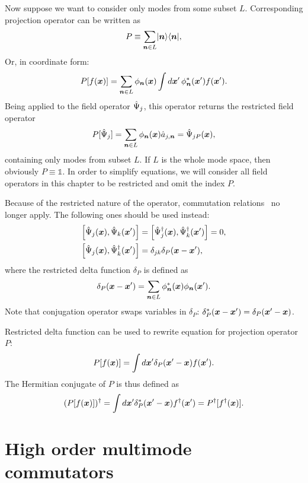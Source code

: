 Now suppose we want to consider only modes from some subset $L$.
Corresponding projection operator can be written as
\[
	P \equiv \sum\limits_{\boldsymbol{n} \in L} \lvert \boldsymbol{n} \rangle \langle \boldsymbol{n} \rvert,
\]
Or, in coordinate form:
\[
	P [f(\boldsymbol{x})]
	= \sum\limits_{\boldsymbol{n} \in L} \phi_{\boldsymbol{n}} (\boldsymbol{x}) \int
		d\boldsymbol{x}^\prime\, \phi_{\boldsymbol{n}}^*(\boldsymbol{x}^\prime) f(\boldsymbol{x}^\prime).
\]
Being applied to the field operator $\hat{\Psi}_j$, this operator returns the restricted field operator
\[
	P [\hat{\Psi}_j]
	= \sum\limits_{\boldsymbol{n} \in L} \phi_{\boldsymbol{n}} (\boldsymbol{x}) \hat{a}_{j,\boldsymbol{n}}
	= \hat{\Psi}_{jP} (\boldsymbol{x}),
\]
containing only modes from subset $L$.
If $L$ is the whole mode space, then obviously $P \equiv \mathds{1}$.
In order to simplify equations, we will consider all field operators in this chapter to be restricted and omit the index $P$.

Because of the restricted nature of the operator, commutation relations~ no longer apply.
The following ones should be used instead:
\begin{equation}
\label{eqn:multimode-formalism:restricted-commutators}
\begin{split}
	\left[ \hat{\Psi}_j(\boldsymbol{x}), \hat{\Psi}_k(\boldsymbol{x}^\prime) \right]
	& = \left[ \hat{\Psi}_j^\dagger(\boldsymbol{x}), \hat{\Psi}_k^\dagger(\boldsymbol{x}^\prime) \right] = 0, \\
	\left[ \hat{\Psi}_j(\boldsymbol{x}), \hat{\Psi}_k^\dagger(\boldsymbol{x}^\prime) \right]
	& = \delta_{jk} \delta_P(\boldsymbol{x} - \boldsymbol{x}^\prime),
\end{split}
\end{equation}
where the restricted delta function $\delta_P$ is defined as
\begin{equation}
\label{eqn:multimode-formalism:restricted-delta}
	\delta_P(\boldsymbol{x} - \boldsymbol{x}^\prime)
	= \sum\limits_{\boldsymbol{n} \in L} \phi_{\boldsymbol{n}}^* (\boldsymbol{x}) \phi_{\boldsymbol{n}} (\boldsymbol{x}^\prime).
\end{equation}
Note that conjugation operator swaps variables in $\delta_P$: $\delta_P^*(\boldsymbol{x} - \boldsymbol{x}^\prime) = \delta_P(\boldsymbol{x}^\prime - \boldsymbol{x})$.

Restricted delta function can be used to rewrite equation for projection operator $P$:
\[
	P [f(\boldsymbol{x})] = \int d\boldsymbol{x}^\prime \delta_P(\boldsymbol{x}^\prime - \boldsymbol{x}) f(\boldsymbol{x}^\prime).
\]
The Hermitian conjugate of $P$ is thus defined as
\[
	(P [f(\boldsymbol{x})])^\dagger
	= \int d\boldsymbol{x}^\prime \delta_P^*(\boldsymbol{x}^\prime - \boldsymbol{x}) f^\dagger(\boldsymbol{x}^\prime)
	= P^\dagger [f^\dagger(\boldsymbol{x})].
\]


\section{High order multimode commutators}

